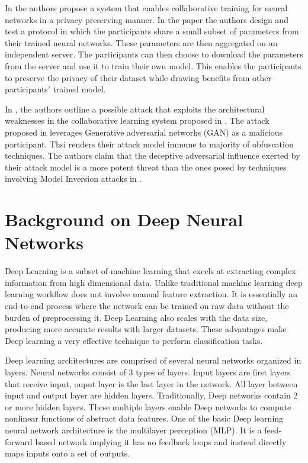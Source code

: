 \documentclass[conference]{IEEEtran}
\begin{document}
In \cite{shokri2015privacy} the authors propose a system that enables collaborative training for neural networks in a privacy preserving manner. In the paper the authors design and test a protocol in which the participants share a small subset of parameters from their trained neural networks. These parameters are then aggregated on an independent server. The participants can then choose to download the parameters from the server and use it to train their own model. This enables the participants to preserve the privacy of their dataset while drawing benefits from other participants' trained model.

In \cite{hitaj2017deep}, the authors outline a possible attack that exploits the architectural weaknesses in the collaborative learning system proposed in \cite{abadi2016deep}. The attack proposed in \cite{hitaj2017deep} leverages Generative adversarial networks (GAN) as a malicious participant. Thsi renders their attack model immune to majority of obfuscation techniques. The authors claim that the  deceptive adversarial influence exerted by their attack model is a more potent threat than the ones posed by techniques involving Model Inversion attacks in \cite{deng2012mnist}.

\section{Background on Deep Neural Networks}
Deep Learning  is a subset of machine learning that excels at extracting complex information from high dimensional data. Unlike traditional machine learning deep learning workflow does not involve manual feature extraction. It is essentially an end-to-end process where the network can be trained on raw data without the burden of preprocessing it.
Deep Learning also scales with the data size, producing more accurate results with larger datasets.
These advantages make Deep learning a very effective technique to perform classification tasks.

Deep learning architectures are comprised of several neural networks organized in layers. Neural networks consist of 3 types of layers. Input layers are first layers that receive input, ouput layer is the last layer in the network. All layer between input and output layer are hidden layers. Traditionally, Deep networks contain 2 or more hidden layers. These multiple layers enable Deep networks to compute nonlinear functions of abstract data features.
One of the basic Deep learning neural network architecture is the multilayer perception (MLP). It is a feed-forward based network implying it has no feedback loops and instead directly maps inputs onto a set of outputs. 
\end{document}
